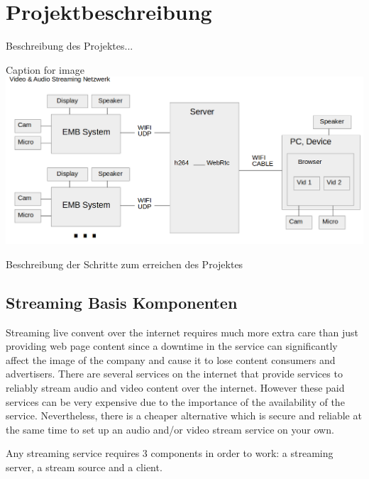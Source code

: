 \newpage
\section{Projektbeschreibung}

Beschreibung des Projektes...\\

\begin{minipage}{\textwidth}
    \begin{center}
        Caption for image
        \includegraphics[scale=0.4]{img/schemaproj.png} 
    \end{center}
\end{minipage}

Beschreibung der Schritte zum erreichen des Projektes


\subsection{Streaming Basis Komponenten}
Streaming live convent over the internet requires much more extra care than just providing web page content since a downtime in the service can significantly affect the image of the company and cause it to lose content consumers and advertisers. There are several services on the internet that provide services to reliably stream audio and video content over the internet. However these paid services can be very expensive due to the importance of the availability of the service. Nevertheless, there is a cheaper alternative which is secure and reliable at the same time to set up an audio and/or video stream service on your own.

Any streaming service requires 3 components in order to work: a streaming server, a stream source and a client.

